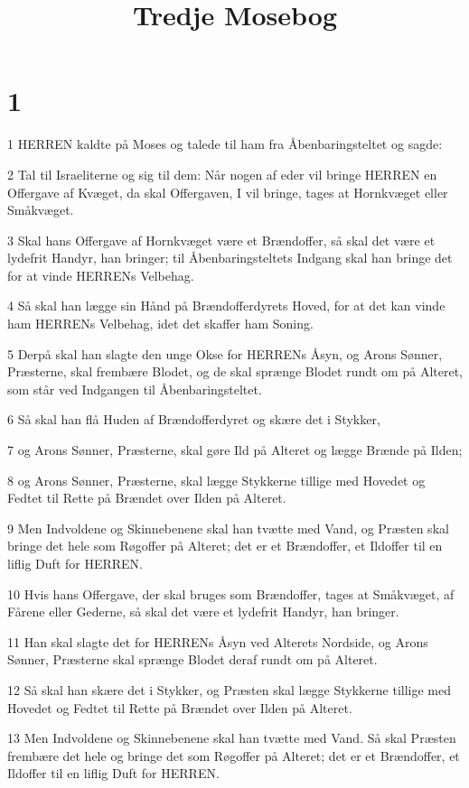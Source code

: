 

\title{Tredje Mosebog}


\chapter{1}

\par 1 HERREN kaldte på Moses og talede til ham fra Åbenbaringsteltet og sagde:
\par 2 Tal til Israeliterne og sig til dem: Når nogen af eder vil bringe HERREN en Offergave af Kvæget, da skal Offergaven, I vil bringe, tages at Hornkvæget eller Småkvæget.
\par 3 Skal hans Offergave af Hornkvæget være et Brændoffer, så skal det være et lydefrit Handyr, han bringer; til Åbenbaringsteltets Indgang skal han bringe det for at vinde HERRENs Velbehag.
\par 4 Så skal han lægge sin Hånd på Brændofferdyrets Hoved, for at det kan vinde ham HERRENs Velbehag, idet det skaffer ham Soning.
\par 5 Derpå skal han slagte den unge Okse for HERRENs Åsyn, og Arons Sønner, Præsterne, skal frembære Blodet, og de skal sprænge Blodet rundt om på Alteret, som står ved Indgangen til Åbenbaringsteltet.
\par 6 Så skal han flå Huden af Brændofferdyret og skære det i Stykker,
\par 7 og Arons Sønner, Præsterne, skal gøre Ild på Alteret og lægge Brænde på Ilden;
\par 8 og Arons Sønner, Præsterne, skal lægge Stykkerne tillige med Hovedet og Fedtet til Rette på Brændet over Ilden på Alteret.
\par 9 Men Indvoldene og Skinnebenene skal han tvætte med Vand, og Præsten skal bringe det hele som Røgoffer på Alteret; det er et Brændoffer, et Ildoffer til en liflig Duft for HERREN.
\par 10 Hvis hans Offergave, der skal bruges som Brændoffer, tages at Småkvæget, af Fårene eller Gederne, så skal det være et lydefrit Handyr, han bringer.
\par 11 Han skal slagte det for HERRENs Åsyn ved Alterets Nordside, og Arons Sønner, Præsterne skal sprænge Blodet deraf rundt om på Alteret.
\par 12 Så skal han skære det i Stykker, og Præsten skal lægge Stykkerne tillige med Hovedet og Fedtet til Rette på Brændet over Ilden på Alteret.
\par 13 Men Indvoldene og Skinnebenene skal han tvætte med Vand. Så skal Præsten frembære det hele og bringe det som Røgoffer på Alteret; det er et Brændoffer, et Ildoffer til en liflig Duft for HERREN.
